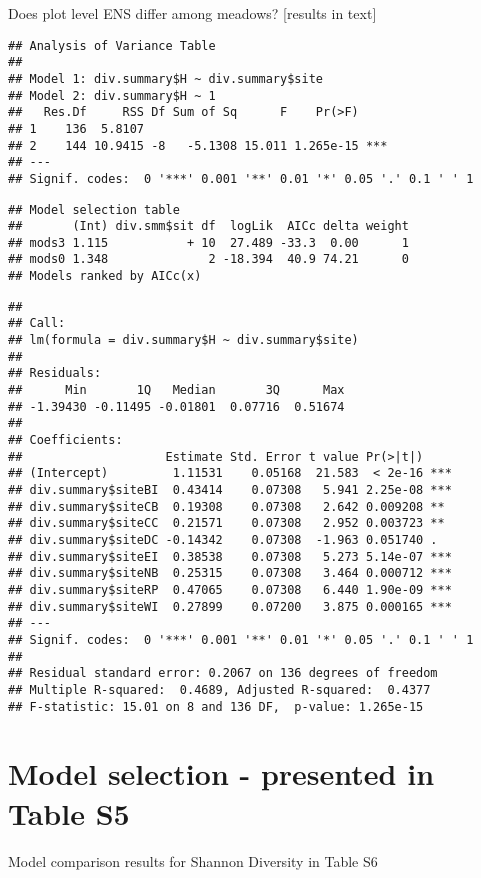 \documentclass[]{article}
\begin{document}
Does plot level ENS differ among meadows? {[}results in text{]}

\begin{verbatim}
## Analysis of Variance Table
## 
## Model 1: div.summary$H ~ div.summary$site
## Model 2: div.summary$H ~ 1
##   Res.Df     RSS Df Sum of Sq      F    Pr(>F)    
## 1    136  5.8107                                  
## 2    144 10.9415 -8   -5.1308 15.011 1.265e-15 ***
## ---
## Signif. codes:  0 '***' 0.001 '**' 0.01 '*' 0.05 '.' 0.1 ' ' 1
\end{verbatim}

\begin{verbatim}
## Model selection table 
##       (Int) div.smm$sit df  logLik  AICc delta weight
## mods3 1.115           + 10  27.489 -33.3  0.00      1
## mods0 1.348              2 -18.394  40.9 74.21      0
## Models ranked by AICc(x)
\end{verbatim}

\begin{verbatim}
## 
## Call:
## lm(formula = div.summary$H ~ div.summary$site)
## 
## Residuals:
##      Min       1Q   Median       3Q      Max 
## -1.39430 -0.11495 -0.01801  0.07716  0.51674 
## 
## Coefficients:
##                    Estimate Std. Error t value Pr(>|t|)    
## (Intercept)         1.11531    0.05168  21.583  < 2e-16 ***
## div.summary$siteBI  0.43414    0.07308   5.941 2.25e-08 ***
## div.summary$siteCB  0.19308    0.07308   2.642 0.009208 ** 
## div.summary$siteCC  0.21571    0.07308   2.952 0.003723 ** 
## div.summary$siteDC -0.14342    0.07308  -1.963 0.051740 .  
## div.summary$siteEI  0.38538    0.07308   5.273 5.14e-07 ***
## div.summary$siteNB  0.25315    0.07308   3.464 0.000712 ***
## div.summary$siteRP  0.47065    0.07308   6.440 1.90e-09 ***
## div.summary$siteWI  0.27899    0.07200   3.875 0.000165 ***
## ---
## Signif. codes:  0 '***' 0.001 '**' 0.01 '*' 0.05 '.' 0.1 ' ' 1
## 
## Residual standard error: 0.2067 on 136 degrees of freedom
## Multiple R-squared:  0.4689, Adjusted R-squared:  0.4377 
## F-statistic: 15.01 on 8 and 136 DF,  p-value: 1.265e-15
\end{verbatim}

\section{Model selection - presented in Table
S5}\label{model-selection---presented-in-table-s5}

Model comparison results for Shannon Diversity in Table S6
\end{document}
